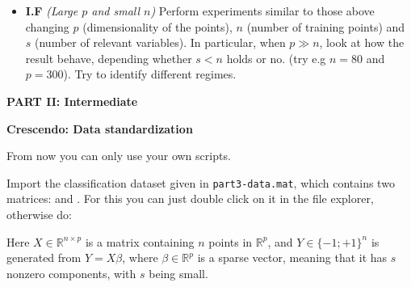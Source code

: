 \documentclass[DIN, pagenumber=false, fontsize=11pt, parskip=half]{scrartcl}
\newcommand{\mysection}[1]{\noindent\large\textbf{#1}}
\begin{document}
\begin{itemize}
	

	\item \textbf{I.F} \emph{(Large $p$ and small $n$)} Perform experiments similar to those above changing $p$ (dimensionality of the points), $n$ (number of training points) and $s$ (number of relevant variables).
	In particular, when $p\gg n$, look at how the result behave, depending whether $s<n$ holds or no. (try e.g $n=80$ and $p=300$). Try to identify different regimes.


\end{itemize}





\begin{center}
\large\textbf{PART II: Intermediate}
\end{center}

\mysection{Crescendo: Data standardization}

From now you can only use your own scripts.

Import the classification dataset given in \texttt{part3-data.mat}, which contains two matrices:  and .
For this you can just double click on it in the file explorer, otherwise do:\\

Here $X \in \mathbb{R}^{n \times p}$ is a matrix containing $n$ points in $\mathbb{R}^p$, and $Y \in \{-1;+1\}^n$ is generated from $Y=X \beta$, where $\beta \in \mathbb{R}^p$ is a sparse vector, meaning that it has $s$ nonzero components, with $s$ being small.
\end{document}
